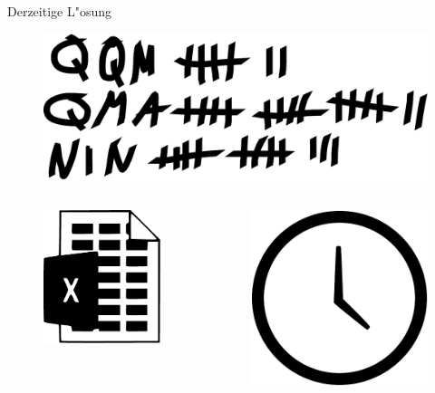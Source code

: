 \begin{frame}{Derzeitige L"osung}
	\begin{figure}[tbh!]
		\includegraphics[width=\textwidth]{images/Strichliste}
	\end{figure}
	\begin{columns}
		\begin{column}{.45\textwidth}
			\begin{figure}[tbh!]
				\includegraphics[width=.65\textwidth]{images/Excel2}
			\end{figure}
		\end{column}
		\begin{column}{.55\textwidth}
			\begin{figure}[tbh!]
				\includegraphics[width=.65\textwidth]{images/Uhr}
			\end{figure}
		\end{column}
	\end{columns}
\end{frame}

